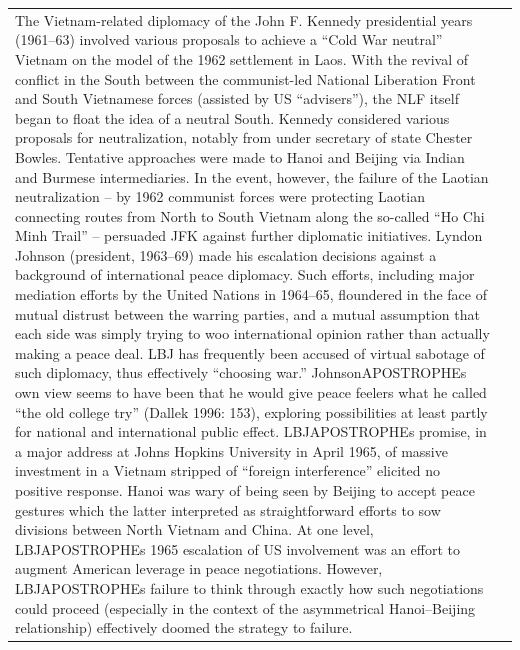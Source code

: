 {\begin{longtable}{p{}p{}}
The Vietnam-related diplomacy of the John F. Kennedy presidential years (1961–63) involved various proposals to achieve a “Cold War neutral” Vietnam on the model of the 1962 settlement in Laos. With the revival of conflict in the South between the communist-led National Liberation Front and South Vietnamese forces (assisted by US “advisers”), the NLF itself began to float the idea of a neutral South. Kennedy considered various proposals for neutralization, notably from under secretary of state Chester Bowles. Tentative approaches were made to Hanoi and Beijing via Indian and Burmese intermediaries. In the event, however, the failure of the Laotian neutralization – by 1962 communist forces were protecting Laotian connecting routes from North to South Vietnam along the so-called “Ho Chi Minh Trail” – persuaded JFK against further diplomatic initiatives. 
Lyndon Johnson (president, 1963–69) made his escalation decisions against a background of international peace diplomacy. Such efforts, including major mediation efforts by the United Nations in 1964–65, floundered in the face of mutual distrust between the warring parties, and a mutual assumption that each side was simply trying to woo international opinion rather than actually making a peace deal. LBJ has frequently been accused of virtual sabotage of such diplomacy, thus effectively “choosing war.” JohnsonAPOSTROPHEs own view seems to have been that he would give peace feelers what he called “the old college try” (Dallek 1996: 153), exploring possibilities at least partly for national and international public effect. LBJAPOSTROPHEs promise, in a major address at Johns Hopkins University in April 1965, of massive investment in a Vietnam stripped of “foreign interference” elicited no positive response. Hanoi was wary of being seen by Beijing to accept peace gestures which the latter interpreted as straightforward efforts to sow divisions between North Vietnam and China. At one level, LBJAPOSTROPHEs 1965 escalation of US involvement was an effort to augment American leverage in peace negotiations. However, LBJAPOSTROPHEs failure to think through exactly how such negotiations could proceed (especially in the context of the asymmetrical Hanoi–Beijing relationship) effectively doomed the strategy to failure.
\\

\end{longtable}}
